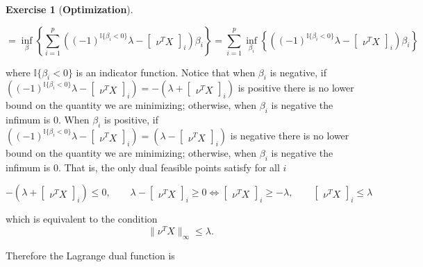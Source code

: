 \documentclass{article}
\theoremstyle{definition}
\newtheorem{exercise}{Exercise}
\theoremstyle{definition}
\theoremstyle{definition}
\theoremstyle{definition}
\begin{document}
\begin{exercise}[\textbf{Optimization}]
\begin{enumerate}[(a)]
 \[
 =  \inf_{\beta} \left\{ \sum_{i=1}^p  \left((-1)^{\mathbb{I}{\{\beta_i < 0\}}} \lambda-  \begin{bmatrix} \nu^T X \end{bmatrix}_i  \right)    \beta_i  \right\}   =  \sum_{i=1}^p  \inf_{\beta_i} \left\{ \left((-1)^{\mathbb{I}{\{\beta_i < 0\}}} \lambda-  \begin{bmatrix} \nu^T X \end{bmatrix}_i  \right)    \beta_i  \right\} 
 \]
 
where \(\mathbb{I}{\{\beta_i < 0\}}\) is an indicator function. Notice that when \(\beta_i\) is negative, if \(\left((-1)^{\mathbb{I}{\{\beta_i < 0\}}} \lambda-  \begin{bmatrix} \nu^T X \end{bmatrix}_i  \right) =  -\left(\lambda+  \begin{bmatrix} \nu^T X \end{bmatrix}_i  \right)\) is positive there is no lower bound on the quantity we are minimizing; otherwise, when \(\beta_i\) is negative the infimum is 0. When \(\beta_i\) is positive, if  \(\left((-1)^{\mathbb{I}{\{\beta_i < 0\}}} \lambda-  \begin{bmatrix} \nu^T X \end{bmatrix}_i  \right) =  \left(\lambda-  \begin{bmatrix} \nu^T X \end{bmatrix}_i  \right)\) is negative there is no lower bound on the quantity we are minimizing; otherwise, when \(\beta_i\) is negative the infimum is 0. That is, the only dual feasible points satisfy for all \(i\)

\[
  -\left(\lambda+  \begin{bmatrix} \nu^T X \end{bmatrix}_i  \right) \leq 0, \qquad \lambda-  \begin{bmatrix} \nu^T X \end{bmatrix}_i   \geq 0 \iff \begin{bmatrix} \nu^TX\end{bmatrix}_i \geq -\lambda, \qquad \begin{bmatrix} \nu^TX\end{bmatrix}_i \leq \lambda
\]

which is equivalent to the condition
\[
\lVert \nu^TX \rVert_\infty \leq \lambda.
\]

Therefore the Lagrange dual function is



\end{enumerate}
\end{exercise}
\end{document}

